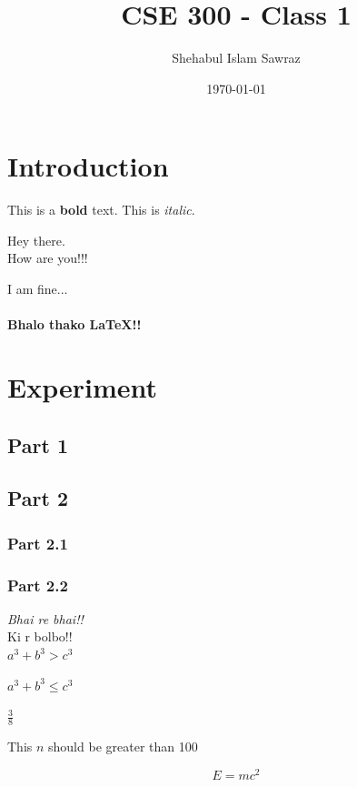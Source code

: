 \documentclass[28pt,a4paper]{article}
\title{CSE 300 - Class 1}
\author{Shehabul Islam Sawraz }
\date{\today}
\begin{document}
\maketitle

\tableofcontents %
\pagebreak %

\section{Introduction}
This is a \textbf{bold} text. This is \textit{italic}.

%

Hey there.\\How are you!!!\par


I am fine...
\paragraph{Bhalo thako \LaTeX!!}

\section{Experiment}\label{sec:exp}
\subsection{Part 1}
\subsection{Part 2}
\subsubsection{Part 2.1}
\subsubsection*{Part 2.2}
\emph{Bhai re bhai!!}\\
{\color{red} Ki r bolbo!! }\\

$a^3+b^3>c^3$

$a^3+b^3 \leq c^3$

$\frac{3}{8}$

This $n$ should be greater than 100

\begin{equation}
    E = mc^2
\end{equation}
\end{document}
